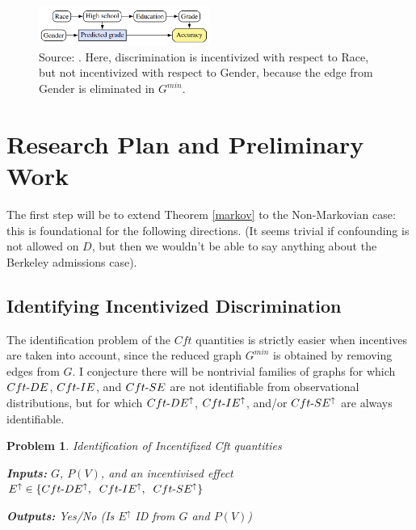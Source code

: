 \documentclass[letterpaper,10pt]{article}
\newtheorem{problem}{Problem}
\begin{document}
\begin{figure}[htbp]
\centerline{\includegraphics[width=0.5\textwidth]{pics/grade_prediction.png}}
\caption{Source: \cite{everitt2021agent}. Here, discrimination is incentivized with respect to Race, but not incentivized with respect to Gender, because the edge from Gender is eliminated in $G^{min}$.}
\label{grades}
\end{figure}


\section{Research Plan and Preliminary Work}\label{plan}
The first step will be to extend Theorem \ref{markov} to the Non-Markovian case: this is foundational for the following directions. (It seems trivial if confounding is not allowed on $D$, but then we wouldn't be able to say anything about the Berkeley admissions case).

\subsection{Identifying Incentivized Discrimination}
The identification problem of the $Cft$ quantities is strictly easier when incentives are taken into account, since the reduced graph $G^{min}$ is obtained by removing edges from $G$. I conjecture there will be nontrivial families of graphs for which $Cft{\text -}DE$, $Cft{\text -}IE$, and $Cft{\text -}SE$ are not identifiable from observational distributions, but for which $Cft{\text -}DE^\uparrow$, $Cft{\text -}IE^\uparrow$, and/or $Cft{\text -}SE^\uparrow$ are always identifiable. 

\begin{problem}{Identification of Incentifized Cft quantities}\label{cft-id}

\textbf{Inputs:} $G$, $P(V)$, and an incentivised effect $E^\uparrow\in\{Cft{\text -}DE^\uparrow,\hspace{2mm} Cft{\text -}IE^\uparrow,\hspace{2mm} Cft{\text -}SE^\uparrow\}$

\textbf{Outputs:} Yes/No (Is $E^\uparrow$ ID from $G$ and $P(V)$)
\end{problem}
\end{document}
